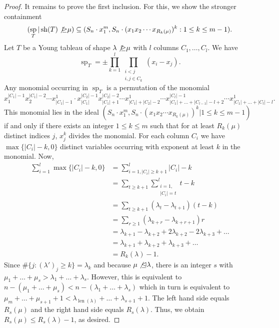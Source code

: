 \documentclass[11pt]{amsart}
\theoremstyle{definition}
\DeclareMathOperator{\sh}{sh}
\DeclareMathOperator{\len}{len}
\DeclareMathOperator{\spe}{sp}
\begin{document}
\begin{proof}
It remains to prove the first inclusion. For this, we show the stronger containment
\[(\spe_T | \sh (T) \not \unrhd \mu) \subseteq (S_n \cdot x_1^m, S_n \cdot (x_1 x_2 \cdots x_{R_k(\mu)})^k : 1 \leq k \leq m-1) .\]
Let $T$ be a Young tableau of shape $\lambda \not \unrhd \mu$ with $l$ columns $C_1,\ldots,C_l$. We have $$\spe_T = \pm \prod_{k=1}^l\prod_{\substack{i < j \\ i,j \in C_k}} (x_i-x_j).$$ Any monomial occurring in $\spe_T$ is a permutation of the monomial
$$x_1^{|C_1|-1}x_2^{|C_1|-2}\cdots x^1_{|C_1|-1} \cdot x_{|C_1|}^{|C_2|-1} x_{|C_1|+1}^{|C_2|-2} \cdots x^1_{|C_1|+|C_2|-2} \cdots x_{|C_1|+\ldots+|C_{l-1}|-l+2}^{|C_l|-1}\cdots x_{|C_1|+\ldots+|C_{l}|-l}^1.$$
This monomial lies in the ideal $(S_n \cdot x_1^m, S_n \cdot (x_1 x_2 \cdots x_{R_k(\mu)})^k | 1 \leq k \leq m-1)$ if and only if there exists an integer $1 \leq k \leq m$ such that for at least $R_k(\mu)$ distinct indices $j$, $x_j^k$ divides the monomial. For each column $C_i$ we have $\max\{|C_i|-k,0\}$ distinct variables occurring with exponent at least $k$ in the monomial. Now, 
\begin{align*}
    \sum_{i=1}^l\max\{|C_i|-k,0\} &= \sum_{i=1, |C_i| \geq k+1}^l |C_i|-k \\ 
    &= \sum_{t \geq k+1}\sum_{\substack{i=1, \\ |C_i|=t}}^l t-k \\
     &= \sum_{t \geq k+1} (\lambda_t-\lambda_{t+1})(t-k) \\
      &= \sum_{r \geq 1} (\lambda_{k+r}-\lambda_{k+r+1})r \\
      &= \lambda_{k+1}-\lambda_{k+2}+2\lambda_{k+2}-2\lambda_{k+3}+\ldots \\
      &= \lambda_{k+1} + \lambda_{k+2} + \lambda_{k+3} + \ldots \\
      &= R_k(\lambda)-1.
\end{align*}
Since $\# \{ j : (\lambda')_j \geq k \} = \lambda_k$ and because $\mu \not \unlhd \lambda$, there is an integer $s$ with $\mu_1+\ldots+\mu_s > \lambda_1 + \ldots +\lambda_s$. However, this is equivalent to $n - (\mu_1+\ldots+\mu_s) < n - (\lambda_1+\ldots+\lambda_s)$ which in turn is equivalent to $\mu_m + \ldots + \mu_{s+1} + 1 < \lambda_{\len (\lambda)}+\ldots+\lambda_{s+1}+1$. The left hand side equals $R_s(\mu)$ and the right hand side equals $R_s(\lambda)$. Thus, we obtain $R_s(\mu) \leq R_s(\lambda)-1$, as desired.
\end{proof}
\end{document}
